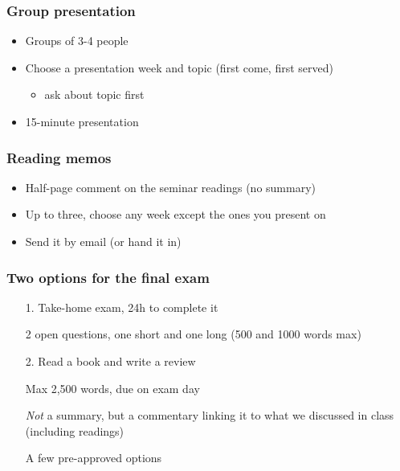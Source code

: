 \documentclass[aspectratio=43]{beamer}
\begin{document}
\begin{frame}
\frametitle{Group presentation}
\centering

\begin{itemize}
  \item Groups of 3-4 people
  \item Choose a presentation week and topic (first come, first served)
  \begin{itemize}
    \item ask about topic first
  \end{itemize}
  \item 15-minute presentation
\end{itemize}

\end{frame}

\begin{frame}
\frametitle{Reading memos}
\centering

\begin{itemize}
  \item Half-page comment on the seminar readings (no summary)
  \item Up to three, choose any week except the ones you present on
  \item Send it by email (or hand it in) 
\end{itemize}

\end{frame}

\begin{frame}
\frametitle{Two options for the final exam}
\centering

\begin{itemize}
\item[1.] Take-home exam, 24h to complete it
\item[] 2 open questions, one short and one long (500 and 1000 words max)
\item[]
\item[2.] Read a book and write a review
\item[] Max 2,500 words, due on exam day
\item[] \textit{Not} a summary, but a commentary linking it to what we discussed in class (including readings)
\item[] A few pre-approved options
\end{itemize}

\end{frame}
\end{document}
